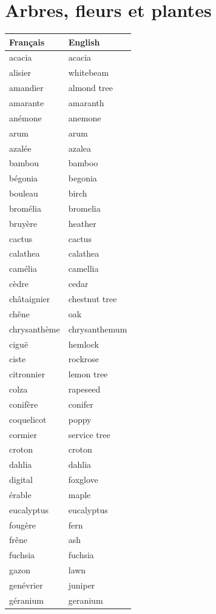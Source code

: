 \documentclass[12pt,a4paper]{article}
\begin{document}
\section{Arbres, fleurs et plantes}
\begin{longtable}{p{4cm} p{6cm}}
\toprule
\textbf{Français} & \textbf{English} \\
\midrule
acacia & acacia \\
alisier & whitebeam \\
amandier & almond tree \\
amarante & amaranth \\
anémone & anemone \\
arum & arum \\
azalée & azalea \\
bambou & bamboo \\
bégonia & begonia \\
bouleau & birch \\
bromélia & bromelia \\
bruyère & heather \\
cactus & cactus \\
calathea & calathea \\
camélia & camellia \\
cèdre & cedar \\
châtaignier & chestnut tree \\
chêne & oak \\
chrysanthème & chrysanthemum \\
ciguë & hemlock \\
ciste & rockrose \\
citronnier & lemon tree \\
colza & rapeseed \\
conifère & conifer \\
coquelicot & poppy \\
cormier & service tree \\
croton & croton \\
dahlia & dahlia \\
digital & foxglove \\
érable & maple \\
eucalyptus & eucalyptus \\
fougère & fern \\
frêne & ash \\
fuchsia & fuchsia \\
gazon & lawn \\
genévrier & juniper \\
géranium & geranium \\

\end{longtable}
\end{document}
